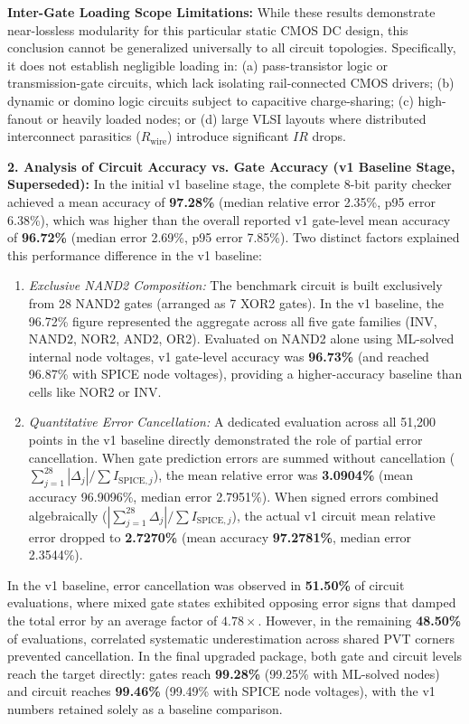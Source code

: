 \documentclass[11pt,a4paper]{article}
\numberwithin{table}{section}
\numberwithin{figure}{section}
\begin{document}
\textbf{Inter-Gate Loading Scope Limitations:} While these results demonstrate near-lossless modularity for this particular static CMOS DC design, this conclusion cannot be generalized universally to all circuit topologies. Specifically, it does not establish negligible loading in: (a) pass-transistor logic or transmission-gate circuits, which lack isolating rail-connected CMOS drivers; (b) dynamic or domino logic circuits subject to capacitive charge-sharing; (c) high-fanout or heavily loaded nodes; or (d) large VLSI layouts where distributed interconnect parasitics ($R_{\mathrm{wire}}$) introduce significant $IR$ drops.

\textbf{2. Analysis of Circuit Accuracy vs. Gate Accuracy (v1 Baseline Stage, Superseded):}
In the initial v1 baseline stage, the complete 8-bit parity checker achieved a mean accuracy of \textbf{97.28\%} (median relative error 2.35\%, p95 error 6.38\%), which was higher than the overall reported v1 gate-level mean accuracy of \textbf{96.72\%} (median error 2.69\%, p95 error 7.85\%). Two distinct factors explained this performance difference in the v1 baseline:
\begin{enumerate}[noitemsep]
    \item \textit{Exclusive NAND2 Composition:} The benchmark circuit is built exclusively from 28 NAND2 gates (arranged as 7 XOR2 gates). In the v1 baseline, the 96.72\% figure represented the aggregate across all five gate families (INV, NAND2, NOR2, AND2, OR2). Evaluated on NAND2 alone using ML-solved internal node voltages, v1 gate-level accuracy was \textbf{96.73\%} (and reached 96.87\% with SPICE node voltages), providing a higher-accuracy baseline than cells like NOR2 or INV.
    \item \textit{Quantitative Error Cancellation:} A dedicated evaluation across all 51,200 points in the v1 baseline directly demonstrated the role of partial error cancellation. When gate prediction errors are summed without cancellation ($\sum_{j=1}^{28} |\Delta_j| / \sum I_{\mathrm{SPICE}, j}$), the mean relative error was \textbf{3.0904\%} (mean accuracy 96.9096\%, median error 2.7951\%). When signed errors combined algebraically ($|\sum_{j=1}^{28} \Delta_j| / \sum I_{\mathrm{SPICE}, j}$), the actual v1 circuit mean relative error dropped to \textbf{2.7270\%} (mean accuracy \textbf{97.2781\%}, median error 2.3544\%).
\end{enumerate}
In the v1 baseline, error cancellation was observed in \textbf{51.50\%} of circuit evaluations, where mixed gate states exhibited opposing error signs that damped the total error by an average factor of $4.78\times$. However, in the remaining \textbf{48.50\%} of evaluations, correlated systematic underestimation across shared PVT corners prevented cancellation. In the final upgraded package, both gate and circuit levels reach the target directly: gates reach \textbf{99.28\%} (99.25\% with ML-solved nodes) and circuit reaches \textbf{99.46\%} (99.49\% with SPICE node voltages), with the v1 numbers retained solely as a baseline comparison.
\end{document}
